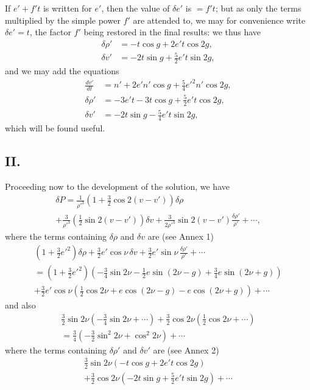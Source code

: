 \documentclass[11pt,a4paper]{book}
\begin{document}
{{If $e' + f't$ is written for $e'$, then the value of $\delta e'$ is $= f't$; but as only the terms multiplied by the simple power $f'$ are attended to, we may for convenience write $\delta e' = t$, the factor $f'$ being restored in the final results: we thus have
\begin{align*}
\delta\rho' &= -t\cos g + 2e't\cos 2g, \\
\delta v' &= -2t\sin g + \tfrac{5}{2}e't\sin 2g,
\end{align*}
and we may add the equations
\begin{align*}
\frac{dv'}{dt} &= n' + 2e'n'\cos g + \tfrac{5}{4}e'^2n'\cos 2g, \\
\delta\rho' &= -3e't - 3t\cos g + \tfrac{5}{2}e't\cos 2g, \\
\delta v' &= -2t\sin g - \tfrac{5}{4}e't\sin 2g,
\end{align*}
which will be found useful.

\subsection*{II.}

Proceeding now to the development of the solution, we have
\begin{multline}
\delta P = \frac{1}{\rho'^3}\left(1 + \tfrac{3}{2}\cos 2(v-v')\right)\delta\rho \\
+ \frac{3}{\rho'^3}\left(\tfrac{1}{2}\sin 2(v-v')\right)\delta v + \frac{3}{2\rho'^3}\sin 2(v-v')\frac{\delta\rho'}{\rho'} + \cdots,
\end{multline}
where the terms containing $\delta\rho$ and $\delta v$ are (see Annex 1)
\begin{multline*}
\left(1 + \tfrac{3}{2}e'^2\right)\delta\rho + \tfrac{3}{2}e'\cos\nu\,\delta v + \tfrac{3}{2}e'\sin\nu\,\frac{\delta\rho'}{\rho'} + \cdots \\
= \left(1 + \tfrac{3}{2}e'^2\right)\left(-\tfrac{3}{4}\sin 2\nu - \tfrac{1}{2}e\sin(2\nu-g) + \tfrac{3}{4}e\sin(2\nu+g)\right) \\
+ \tfrac{3}{2}e'\cos\nu\left(\tfrac{1}{2}\cos 2\nu + e\cos(2\nu-g) - e\cos(2\nu+g)\right) + \cdots
\end{multline*}
and also
\begin{multline*}
\tfrac{3}{2}\sin 2\nu\left(-\tfrac{3}{4}\sin 2\nu + \cdots\right) + \tfrac{3}{2}\cos 2\nu\left(\tfrac{1}{2}\cos 2\nu + \cdots\right) \\
= \tfrac{3}{4}\left(-\tfrac{3}{2}\sin^2 2\nu + \cos^2 2\nu\right) + \cdots
\end{multline*}
where the terms containing $\delta\rho'$ and $\delta v'$ are (see Annex 2)
\begin{multline*}
\tfrac{3}{2}\sin 2\nu\left(-t\cos g + 2e't\cos 2g\right) \\
+ \tfrac{3}{2}\cos 2\nu\left(-2t\sin g + \tfrac{5}{2}e't\sin 2g\right) + \cdots
\end{multline*}

}}
\end{document}
